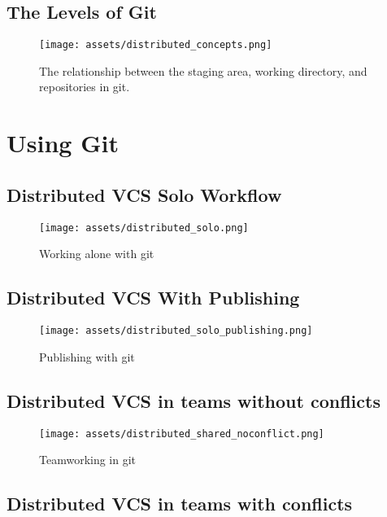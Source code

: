 \documentclass[]{scrartcl}
\makeatletter
\def\maxwidth{\ifdim\Gin@nat@width>\linewidth\linewidth
\else\Gin@nat@width\fi}
\let\Oldincludegraphics\includegraphics
\renewcommand{\includegraphics}[1]{\Oldincludegraphics[width=\maxwidth]{#1}}
\makeatother
\begin{document}
\subsection{The Levels of Git}\label{the-levels-of-git}

\begin{figure}[htbp]
\centering
\texttt{[image: assets/distributed\_concepts.png]}
\caption{The relationship between the staging area, working directory,
and repositories in git.}
\end{figure}

\section{Using Git}\label{using-git}

\subsection{Distributed VCS Solo
Workflow}\label{distributed-vcs-solo-workflow}

\begin{figure}[htbp]
\centering
\texttt{[image: assets/distributed\_solo.png]}
\caption{Working alone with git}
\end{figure}

\subsection{Distributed VCS With
Publishing}\label{distributed-vcs-with-publishing}

\begin{figure}[htbp]
\centering
\texttt{[image: assets/distributed\_solo\_publishing.png]}
\caption{Publishing with git}
\end{figure}

\subsection{Distributed VCS in teams without
conflicts}\label{distributed-vcs-in-teams-without-conflicts}

\begin{figure}[htbp]
\centering
\texttt{[image: assets/distributed\_shared\_noconflict.png]}
\caption{Teamworking in git}
\end{figure}

\subsection{Distributed VCS in teams with
conflicts}\label{distributed-vcs-in-teams-with-conflicts}
\end{document}
